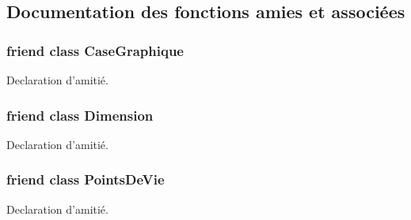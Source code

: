\subsection{Documentation des fonctions amies et associées}
\hypertarget{classgrenouilloland_1_1Vue_ac12b0ba9ebe667c8408ac35bf21598e8}{
\subsubsection[{Case\-Graphique}]{\setlength{\rightskip}{0pt plus 5cm}friend class {\bf Case\-Graphique}\hspace{0.3cm}{\ttfamily [friend]}}}\label{classgrenouilloland_1_1Vue_ac12b0ba9ebe667c8408ac35bf21598e8}
Declaration d'amitié. \hypertarget{classgrenouilloland_1_1Vue_aabae1fdc220bf040d4f5c2c057abfcf5}{
\subsubsection[{Dimension}]{\setlength{\rightskip}{0pt plus 5cm}friend class {\bf Dimension}\hspace{0.3cm}{\ttfamily [friend]}}}\label{classgrenouilloland_1_1Vue_aabae1fdc220bf040d4f5c2c057abfcf5}
Declaration d'amitié. \hypertarget{classgrenouilloland_1_1Vue_a2f6a9fb1ac6fc3eaae981e0630df21d8}{
\subsubsection[{Points\-De\-Vie}]{\setlength{\rightskip}{0pt plus 5cm}friend class {\bf Points\-De\-Vie}\hspace{0.3cm}{\ttfamily [friend]}}}\label{classgrenouilloland_1_1Vue_a2f6a9fb1ac6fc3eaae981e0630df21d8}
Declaration d'amitié. 

